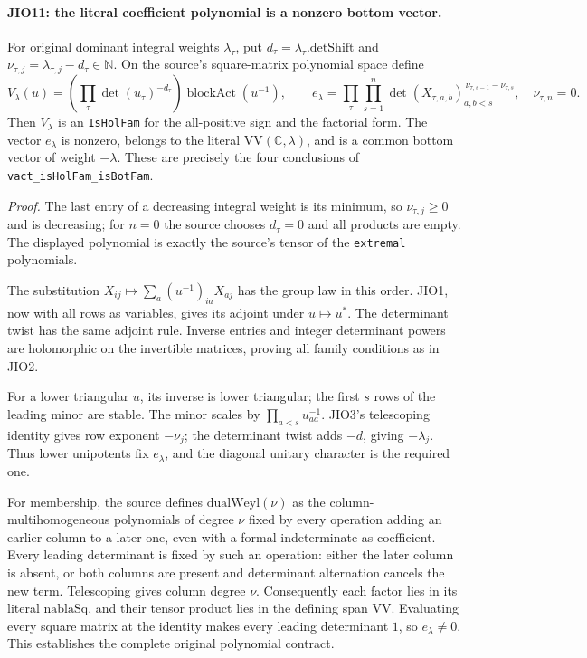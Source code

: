\paragraph{JIO11: the literal coefficient polynomial is a nonzero bottom vector.}
\label{claim:JIO11}
For original dominant integral weights \(\lambda_\tau\), put
\(d_\tau=\lambda_\tau.\mathrm{detShift}\) and
\(\nu_{\tau,j}=\lambda_{\tau,j}-d_\tau\in\mathbb N\).
On the source's square-matrix polynomial space define
\[
 V_\lambda(u)=
       \left(\prod_\tau\det(u_\tau)^{-d_\tau}\right)
                    \operatorname{blockAct}(u^{-1}),\qquad
 e_\lambda=\prod_\tau
            \prod_{s=1}^{n}
        \det(X_{\tau,a,b})_{a,b<s}^{\,\nu_{\tau,s-1}-\nu_{\tau,s}},
 \quad \nu_{\tau,n}=0.
 \tag{JIO.30}
\]
Then \(V_\lambda\) is an \texttt{IsHolFam} for the all-positive
sign and the factorial form.  The vector \(e_\lambda\) is nonzero,
belongs to the literal \(\mathrm{VV}(\mathbb C,\lambda)\), and
is a common bottom vector of weight \(-\lambda\).
These are precisely the four conclusions of
\texttt{vact\_isHolFam\_isBotFam}.

\emph{Proof.}
The last entry of a decreasing integral weight is its minimum,
so \(\nu_{\tau,j}\ge0\) and is decreasing; for \(n=0\) the
source chooses \(d_\tau=0\) and all products are empty.
The displayed polynomial is exactly the source's tensor of
the \texttt{extremal} polynomials.

The substitution \(X_{ij}\mapsto\sum_a(u^{-1})_{ia}X_{aj}\)
has the group law in this order.  JIO1, now with all rows as
variables, gives its adjoint under \(u\mapsto u^*\).
The determinant twist has the same adjoint rule.
Inverse entries and integer determinant powers are holomorphic
on the invertible matrices, proving all family conditions as
in JIO2.

For a lower triangular \(u\), its inverse is lower triangular;
the first \(s\) rows of the leading minor are stable.  The
minor scales by \(\prod_{a<s}u_{aa}^{-1}\).
JIO3's telescoping identity gives row exponent \(-\nu_j\);
the determinant twist adds \(-d\), giving \(-\lambda_j\).
Thus lower unipotents fix \(e_\lambda\), and the diagonal
unitary character is the required one.

For membership, the source defines \(\mathrm{dualWeyl}(\nu)\)
as the column-multihomogeneous polynomials of degree \(\nu\)
fixed by every operation adding an earlier column to a later
one, even with a formal indeterminate as coefficient.
Every leading determinant is fixed by such an operation:
either the later column is absent, or both columns are present
and determinant alternation cancels the new term.
Telescoping gives column degree \(\nu\).
Consequently each factor lies in its literal
\(\mathrm{nablaSq}\), and their tensor product lies in the
defining span \(\mathrm{VV}\).
Evaluating every square matrix at the identity makes every
leading determinant \(1\), so \(e_\lambda\ne0\).
This establishes the complete original polynomial contract.

